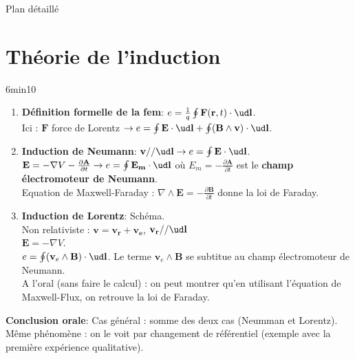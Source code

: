 \begin{reportBlock}{Plan détaillé}
\vspace{1cm}
\section{Théorie de l'induction} 6min10
\begin{enumerate}
    \item \textbf{Définition formelle de la fem}: $e = \frac{1}{q} \oint \mathbf F(\mathbf r, t) \cdot \ud \mathbf l$. \\
    Ici : $\mathbf F$ force de Lorentz $\rightarrow e = \oint \mathbf E \cdot \ud \mathbf l + \oint (\mathbf B \land \mathbf v) \cdot \ud \mathbf l$.
    \item \textbf{Induction de Neumann}: $\mathbf v \slash\slash
 \ud \mathbf l \rightarrow e = \oint \mathbf E \cdot \ud \mathbf l$. \\
 $\mathbf E = - \nabla V - \frac{\partial \mathbf A}{\partial t} \rightarrow e = \oint \mathbf{E_m} \cdot \ud \mathbf l $ où $E_m = - \frac{\partial \mathbf A}{\partial t}$ est le \textbf{champ électromoteur de Neumann}. \\
 Equation de Maxwell-Faraday : $\nabla \land \mathbf E = - \frac{\partial \mathbf B}{\partial t}$ donne la loi de Faraday.
    
    \item \textbf{Induction de Lorentz}: Schéma. \\
    Non relativiste : $\mathbf v = \mathbf{v_r} + \mathbf{v_e}$, $\mathbf{v_r} \slash\slash \ud \mathbf l$ \\
    $\mathbf E = - \nabla V$. \\
    $e = \oint (\mathbf v_e \land \mathbf B) \cdot \ud \mathbf l$. Le terme $\mathbf v_e \land \mathbf B$ se subtitue au champ électromoteur de Neumann. \\
    A l'oral (sans faire le calcul) : on peut montrer qu'en utilisant l'équation de Maxwell-Flux, on retrouve la loi de Faraday.
\end{enumerate}
\textbf{Conclusion orale}: Cas général : somme des deux cas (Neumman et Lorentz). Même phénomène : on le voit par changement de référentiel (exemple avec la première expérience qualitative).

\vspace{1cm}

\end{reportBlock}
